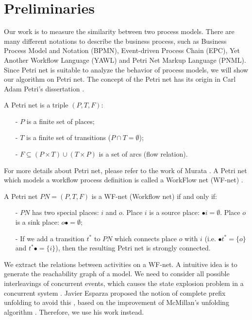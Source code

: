 \documentclass{llncs}
\begin{document}
\section{Preliminaries}\label{sec:preliminaries}
Our work is to measure the similarity between two process models. There are many different notations to describe the business process, such as Business Process Model and Notation (BPMN), Event-driven Process Chain (EPC), Yet Another Workflow Language (YAWL) and Petri Net Markup Language (PNML). Since Petri net is suitable to analyze the behavior of process models, we will show our algorithm on Petri net. The concept of the Petri net has its origin in Carl Adam Petri's dissertation \cite{petri1966kommunikation}.

\begin{definition}\label{def:petrinet}
A Petri net is a triple $(P,T,F)$:
	\begin{itemize}
		\item[-] $P$ is a finite set of places;
		\item[-] $T$ is a finite set of transitions ($P\cap T=\emptyset$);
		\item[-] $F\subseteq(P\times T)\cup(T\times P)$ is a set of arcs (flow relation).
	\end{itemize}
\end{definition}

For more details about Petri net, please refer to the work of Murata \cite{murata1989petri}. A Petri net which models a workflow process definition is called a WorkFlow net (WF-net) \cite{van1998application}.

\begin{definition}[WF-net]\label{def:wfnet}
A Petri net $PN=(P,T,F)$ is a WF-net (Workflow net) if and only if:
	\begin{itemize}
		\item[-] $PN$ has two special places: $i$ and $o$. Place $i$ is a source place: $\bullet i=\emptyset$. Place $o$ is a sink place: $o\bullet =\emptyset$;
		\item[-] If we add a transition $t^{*}$ to $PN$ which connects place $o$ with $i$ (i.e. $\bullet t^{*}=\{o\}$ and $t^{*}\bullet=\{i\}$), then the resulting Petri net is strongly connected.
	\end{itemize}
\end{definition}

We extract the relations between activities on a WF-net. A intuitive idea is to generate the reachability graph of a model. We need to consider all possible interleavings of concurrent events, which causes the state explosion problem in a concurrent system \cite{mcmillan1995technique}. Javier Esparza proposed the notion of complete prefix unfolding to avoid this \cite{esparza1996improvement}, based on the improvement of McMillan's unfolding algorithm \cite{mcmillan1995technique}. Therefore, we use his work instead.
\end{document}
